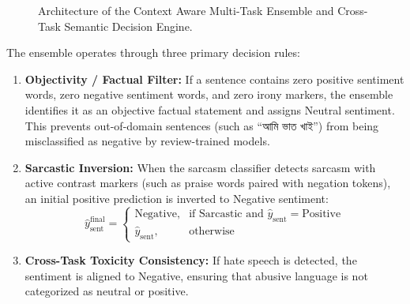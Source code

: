 \documentclass[11pt,a4paper]{article}
\newcommand{\bn}[1]{{\bengalifont #1}}
\newcommand{\bn}[1]{#1}
\begin{document}
\begin{figure}[htbp]
{%
}
\caption{Architecture of the Context Aware Multi-Task Ensemble and Cross-Task Semantic Decision Engine.}
\label{fig:ensemble_pipeline}
\end{figure}

The ensemble operates through three primary decision rules:
\begin{enumerate}[leftmargin=*]
    \item \textbf{Objectivity / Factual Filter:} If a sentence contains zero positive sentiment words, zero negative sentiment words, and zero irony markers, the ensemble identifies it as an objective factual statement and assigns Neutral sentiment. This prevents out-of-domain sentences (such as \bn{“আমি ভাত খাই”}) from being misclassified as negative by review-trained models.
    \item \textbf{Sarcastic Inversion:} When the sarcasm classifier detects sarcasm with active contrast markers (such as praise words paired with negation tokens), an initial positive prediction is inverted to Negative sentiment:
    \begin{equation}
    \hat{y}_{\text{sent}}^{\text{final}} = 
    \begin{cases} 
    \text{Negative}, & \text{if Sarcastic and } \hat{y}_{\text{sent}} = \text{Positive} \\
    \hat{y}_{\text{sent}}, & \text{otherwise}
    \end{cases}
    \end{equation}
    \item \textbf{Cross-Task Toxicity Consistency:} If hate speech is detected, the sentiment is aligned to Negative, ensuring that abusive language is not categorized as neutral or positive.
\end{enumerate}
\end{document}
